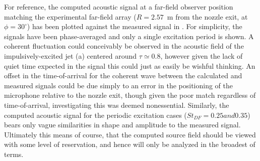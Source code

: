 For reference, the computed acoustic signal at a far-field observer position matching the experimental far-field array ($R = 2.57$~m from the nozzle exit, at $\phi = 30^\circ$) has been plotted against the measured signal in .
For simplicity, the signals have been phase-averaged and only a single excitation period is shown.
A coherent fluctuation could conceivably be observed in the acoustic field of the impulsively-excited jet (a) centered around $\tau \simeq 0.8$, however given the lack of quiet time expected in the signal this could just as easily be wishful thinking.
An offset in the time-of-arrival for the coherent wave between the calculated and measured signals could be due simply to an error in the positioning of the microphone relative to the nozzle exit, though given the poor match regardless of time-of-arrival, investigating this was deemed nonessential.
Similarly, the computed acoustic signal for the periodic excitation cases ($St_{DF} = 0.25$$ and $$0.35$) bears only vague similarities in shape and amplitude to the measured signal.
Ultimately this means of course, that the computed source field should be viewed with some level of reservation, and hence will only be analyzed in the broadest of terms.
